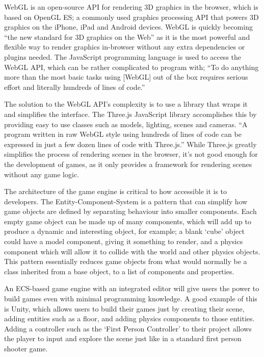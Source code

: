 \documentclass[a4paper, 12pt]{article}
\begin{document}
WebGL is an open-source API for rendering 3D graphics in the browser, which is based on OpenGL ES; a commonly used graphics processing API that powers 3D graphics on the iPhone, iPad and Android devices.\cite{parisi2012webgl} WebGL is quickly becoming ``the new standard for 3D graphics on the Web''\cite[p2]{parisi2012webgl} as it is the most powerful and flexible way to render graphics in-browser without any extra dependencies or plugins needed. The JavaScript programming language is used to access the WebGL API, which can be rather complicated to program with; ``To do anything more than the most basic tasks using [WebGL] out of the box requires serious effort and literally hundreds of lines of code.''\cite[p44]{parisi2014programming}

The solution to the WebGL API's complexity is to use a library that wraps it and simplifies the interface. The Three.js\cite{threejs} JavaScript library accomplishes this by providing easy to use classes such as models, lighting, scenes and cameras. ``A program written in raw WebGL style using hundreds of lines of code can be expressed in just a few dozen lines of code with Three.js.''\cite[p57]{parisi2014programming} While Three.js greatly simplifies the process of rendering scenes in the browser, it's not good enough for the development of games, as it only provides a framework for rendering scenes without any game logic.

The architecture of the game engine is critical to how accessible it is to developers. The Entity-Component-System is a pattern that can simplify how game objects are defined by separating behaviour into smaller components. Each empty game object can be made up of many components, which will add up to produce a dynamic and interesting object, for example; a blank `cube' object could have a model component, giving it something to render, and a physics component which will allow it to collide with the world and other physics objects.\cite{gregory2014game} This pattern essentially reduces game objects from what would normally be a class inherited from a base object, to a list of components and properties.

An ECS-based game engine with an integrated editor will give users the power to build games even with minimal programming knowledge. A good example of this is Unity, which allows users to build their games just by creating their scene, adding entities such as a floor, and adding physics components to those entities.\cite{unitycreatingscenes} Adding a controller such as the `First Person Controller' to their project allows the player to input and explore the scene just like in a standard first person shooter game.\cite{unitycharactercontrol}
\end{document}

